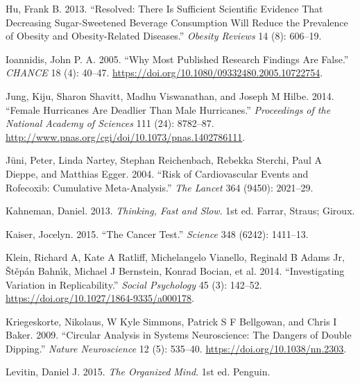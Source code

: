 \documentclass[
  10pt,
  b5paper]{book}
\newlength{\cslhangindent}
\newlength{\cslentryspacingunit} %
\newenvironment{CSLReferences}[2] %
 {%
  \setlength{\parindent}{0pt}
  \ifodd #1
  \let\oldpar\par
  \def\par{\hangindent=\cslhangindent\oldpar}
  \fi
  \setlength{\parskip}{#2\cslentryspacingunit}
 }%
 {}
\begin{document}
\begin{CSLReferences}{1}{0}
\leavevmode{}%
Hu, Frank B. 2013. {``Resolved: There Is Sufficient Scientific Evidence That Decreasing Sugar-Sweetened Beverage Consumption Will Reduce the Prevalence of Obesity and Obesity-Related Diseases.''} \emph{Obesity Reviews} 14 (8): 606--19.

\leavevmode{}%
Ioannidis, John P. A. 2005. {``Why Most Published Research Findings Are False.''} \emph{CHANCE} 18 (4): 40--47. \url{https://doi.org/10.1080/09332480.2005.10722754}.

\leavevmode{}%
Jung, Kiju, Sharon Shavitt, Madhu Viswanathan, and Joseph M Hilbe. 2014. {``Female Hurricanes Are Deadlier Than Male Hurricanes.''} \emph{Proceedings of the National Academy of Sciences} 111 (24): 8782--87. \url{http://www.pnas.org/cgi/doi/10.1073/pnas.1402786111}.

\leavevmode{}%
Jüni, Peter, Linda Nartey, Stephan Reichenbach, Rebekka Sterchi, Paul A Dieppe, and Matthias Egger. 2004. {``Risk of Cardiovascular Events and Rofecoxib: Cumulative Meta-Analysis.''} \emph{The Lancet} 364 (9450): 2021--29.

\leavevmode{}%
Kahneman, Daniel. 2013. \emph{Thinking, Fast and Slow}. 1st ed. Farrar, Straus; Giroux.

\leavevmode{}%
Kaiser, Jocelyn. 2015. {``The Cancer Test.''} \emph{Science} 348 (6242): 1411--13.

\leavevmode{}%
Klein, Richard A, Kate A Ratliff, Michelangelo Vianello, Reginald B Adams Jr, Štěpán Bahnı́k, Michael J Bernstein, Konrad Bocian, et al. 2014. {``Investigating Variation in Replicability.''} \emph{Social Psychology} 45 (3): 142--52. \url{https://doi.org/10.1027/1864-9335/a000178}.

\leavevmode{}%
Kriegeskorte, Nikolaus, W Kyle Simmons, Patrick S F Bellgowan, and Chris I Baker. 2009. {``Circular Analysis in Systems Neuroscience: The Dangers of Double Dipping.''} \emph{Nature Neuroscience} 12 (5): 535--40. \url{https://doi.org/10.1038/nn.2303}.

\leavevmode{}%
Levitin, Daniel J. 2015. \emph{The Organized Mind}. 1st ed. Penguin.


\end{CSLReferences}
\end{document}
